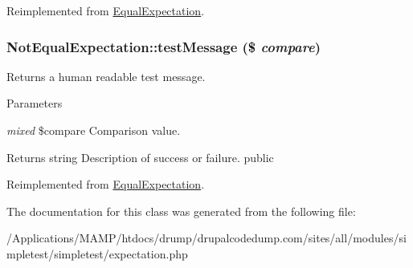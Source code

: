 Reimplemented from \hyperlink{class_equal_expectation_a412b216b1ba36e37d342aebb821ccb55}{EqualExpectation}.\hypertarget{class_not_equal_expectation_acdebe1e65b7080f419bdaad3a15981a0}{
\subsubsection[{testMessage}]{\setlength{\rightskip}{0pt plus 5cm}NotEqualExpectation::testMessage (\$ {\em compare})}}
\label{class_not_equal_expectation_acdebe1e65b7080f419bdaad3a15981a0}
Returns a human readable test message. 
\begin{DoxyParams}{Parameters}
\item[{\em mixed}]\$compare Comparison value. \end{DoxyParams}
\begin{DoxyReturn}{Returns}
string Description of success or failure.  public 
\end{DoxyReturn}


Reimplemented from \hyperlink{class_equal_expectation_a707aa690ff9312ff1b99733d859f7f6f}{EqualExpectation}.

The documentation for this class was generated from the following file:\begin{DoxyCompactItemize}
\item 
/Applications/MAMP/htdocs/drump/drupalcodedump.com/sites/all/modules/simpletest/simpletest/expectation.php\end{DoxyCompactItemize}
